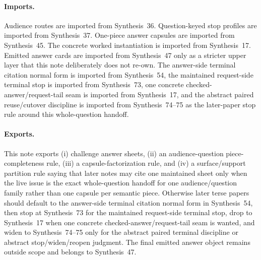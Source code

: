 \documentclass[11pt]{article}
\begin{document}
\paragraph{Imports.}
Audience routes are imported from Synthesis~36.\cite{series:challengeroutes}
Question-keyed stop profiles are imported from Synthesis~37.\cite{series:challengestops}
One-piece answer capsules are imported from Synthesis~45.\cite{series:challengeanswercapsules}
The concrete worked instantiation is imported from Synthesis~17.\cite{series:workedexample}
Emitted answer cards are imported from Synthesis~47 only as a stricter upper layer that this note deliberately does not re-own.\cite{series:challengeanswercards}
The answer-side terminal citation normal form is imported from Synthesis~54, the maintained request-side terminal stop is imported from Synthesis~73, one concrete checked-answer/request-tail seam is imported from Synthesis~17, and the abstract paired reuse/cutover discipline is imported from Synthesis~74--75 as the later-paper stop rule around this whole-question handoff.\cite{series:challengeanswerreviewmenus,series:publicrequestresponsepacketrefreshresponsepacketclosureverdicts,series:workedexample,series:publicrequestresponsepacketrefreshresponsepacketclosureverdicts,series:pairedterminalcitationdiscipline,series:pairedterminalcutoverrules}

\paragraph{Exports.}
This note exports (i) challenge answer sheets, (ii) an audience-question piece-completeness rule, (iii) a capsule-factorization rule, and (iv) a surface/support partition rule saying that later notes may cite one maintained sheet only when the live issue is the exact whole-question handoff for one audience/question family rather than one capsule per semantic piece.
Otherwise later terse papers should default to the answer-side terminal citation normal form in Synthesis~54, then stop at Synthesis~73 for the maintained request-side terminal stop, drop to Synthesis~17 when one concrete checked-answer/request-tail seam is wanted, and widen to Synthesis~74--75 only for the abstract paired terminal discipline or abstract stop/widen/reopen judgment. The final emitted answer object remains outside scope and belongs to Synthesis~47.\cite{series:challengeanswercards,series:challengeanswerreviewmenus,series:publicrequestresponsepacketrefreshresponsepacketclosureverdicts,series:workedexample,series:publicrequestresponsepacketrefreshresponsepacketclosureverdicts,series:pairedterminalcitationdiscipline,series:pairedterminalcutoverrules}
\end{document}

